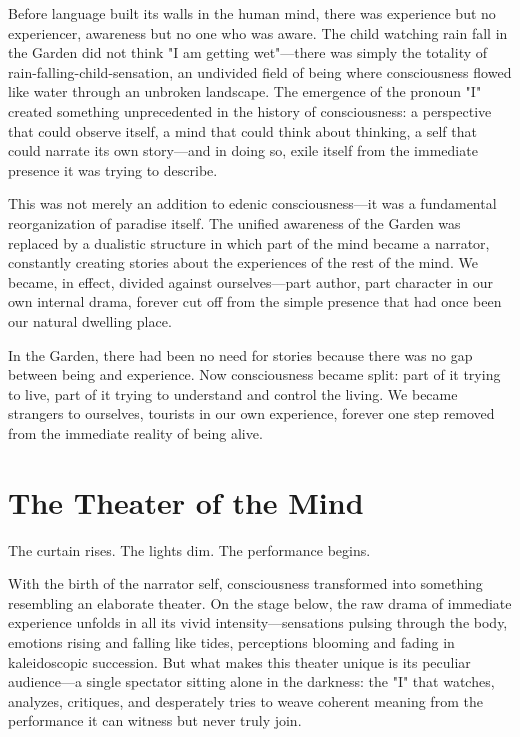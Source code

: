 Before language built its walls in the human mind, there was experience but no experiencer, awareness but no one who was aware. The child watching rain fall in the Garden did not think "I am getting wet"—there was simply the totality of rain-falling-child-sensation, an undivided field of being where consciousness flowed like water through an unbroken landscape. The emergence of the pronoun "I" created something unprecedented in the history of consciousness: a perspective that could observe itself, a mind that could think about thinking, a self that could narrate its own story—and in doing so, exile itself from the immediate presence it was trying to describe.

This was not merely an addition to edenic consciousness—it was a fundamental reorganization of paradise itself. The unified awareness of the Garden was replaced by a dualistic structure in which part of the mind became a narrator, constantly creating stories about the experiences of the rest of the mind. We became, in effect, divided against ourselves—part author, part character in our own internal drama, forever cut off from the simple presence that had once been our natural dwelling place.

In the Garden, there had been no need for stories because there was no gap between being and experience. Now consciousness became split: part of it trying to live, part of it trying to understand and control the living. We became strangers to ourselves, tourists in our own experience, forever one step removed from the immediate reality of being alive.

\section{The Theater of the Mind}

The curtain rises. The lights dim. The performance begins.

With the birth of the narrator self, consciousness transformed into something resembling an elaborate theater. On the stage below, the raw drama of immediate experience unfolds in all its vivid intensity—sensations pulsing through the body, emotions rising and falling like tides, perceptions blooming and fading in kaleidoscopic succession. But what makes this theater unique is its peculiar audience—a single spectator sitting alone in the darkness: the "I" that watches, analyzes, critiques, and desperately tries to weave coherent meaning from the performance it can witness but never truly join.

